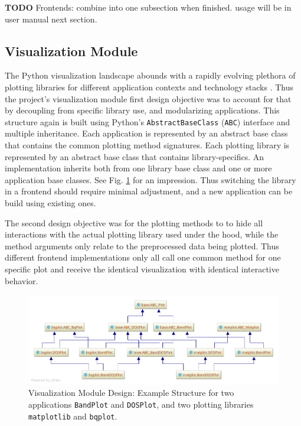 \textbf{TODO} Frontends: combine into one subsection when finished. usage will
be in user manual next section.

\subsection{Visualization Module}
\label{sec:visualization-interface}

The Python visualization landscape abounds with a rapidly evolving plethora of
plotting libraries for different application contexts and technology stacks
\cite{python-viz-landscape}. Thus the project's visualization module first
design objective was to account for that by decoupling from specific library
use, and modularizing applications. This structure again is built using Python's
\texttt{AbstractBaseClass} (\texttt{ABC}) interface and multiple inheritance.
Each application is represented by an abstract base class that contains the
common plotting method signatures. Each plotting library is represented by an
abstract base class that contains library-specifics. An implementation inherits
both from one library base class and one or more application base classes. See
Fig. \ref{fig:visualization-module} for an impression. Thus switching the
library in a frontend should require minimal adjustment, and a new application
can be build using existing ones.

The second design objective was for the plotting methods to to hide all
interactions with the actual plotting library used under the hood, while the
method arguments only relate to the preprocessed data being plotted. Thus
different frontend implementations only all call one common method for one
specific plot and receive the identical visualization with identical interactive
behavior.

\begin{figure}[htb!]
    \centering
    \includegraphics[width=1.0\linewidth]{img/pycharm_uml/matplot.png}
    \caption[Visualization Module Design]{Visualization Module Design: Example
      Structure for two applications \texttt{BandPlot} and \texttt{DOSPlot}, and
      two plotting libraries \texttt{matplotlib} and \texttt{bqplot}.}
    \label{fig:visualization-module}
\end{figure}

